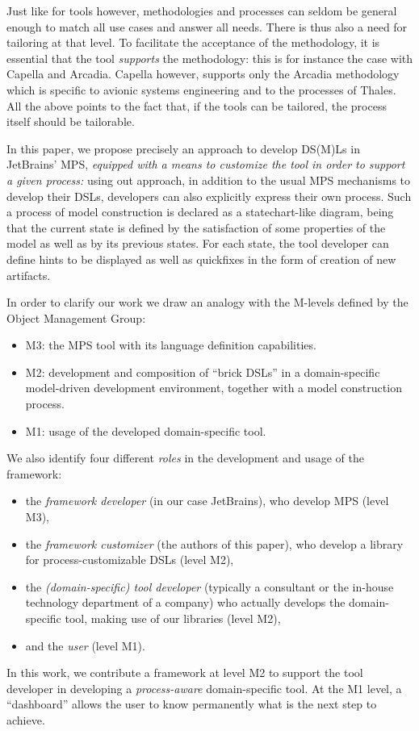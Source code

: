 Just like for tools however, methodologies and processes can seldom be general
enough to match all use cases and answer all needs. There is thus also a need
for tailoring at that level. To facilitate the acceptance of the methodology, it
is essential that the tool \emph{supports} the methodology: this is for instance
the case with Capella and Arcadia.
Capella however, supports only the Arcadia methodology which is specific to
avionic systems engineering and to the processes of Thales.
All the above points to the fact that, if the tools can be tailored, the process
itself should be tailorable.

In this paper, we propose precisely an approach to develop DS(M)Ls in JetBrains'
MPS, \emph{equipped with a means to customize the tool in order to support a
given process:} using out approach, in addition to the usual MPS mechanisms to
develop their DSLs, developers can also explicitly express their own process.
Such a process of model construction is declared as a
statechart-like diagram, being that the current state is defined by the
satisfaction of some properties of the model as well as by its previous states.
For each state, the tool developer can define hints to be displayed as well as
quickfixes in the form of creation of new artifacts.

In order to clarify our work we draw an analogy with the M-levels defined by the Object Management Group:
\vspace{-.1cm}
\begin{itemize}
  \item M3: the MPS tool with its language definition capabilities.
  \item M2: development and composition of ``brick DSLs'' in a
  domain-specific model-driven development environment, together with a
  model construction process.
  \item M1: usage of the developed domain-specific tool.
\end{itemize}
\vspace{-.1cm}
We also identify four different \emph{roles} in the development and
usage of the framework:
\vspace{-.1cm}
\begin{itemize}
  \item the \emph{framework developer} (in our case JetBrains), who develop MPS
  (level M3),
  \item the \emph{framework customizer} (the authors of this paper), who develop
  a library for process-customizable DSLs (level M2),
  \item the \emph{(domain-specific) tool developer} 
    (typically a consultant or the in-house technology department of a company)
    who actually develops the domain-specific tool, making use of our libraries (level M2),
  \item and the \emph{user} (level M1).
\end{itemize}
\vspace{-.1cm}
In this work, we contribute a framework at level M2 to support the tool developer
in developing a \emph{process-aware} domain-specific tool.
At the M1 level, a ``dashboard'' allows the user to know permanently what is the
next step to achieve.

